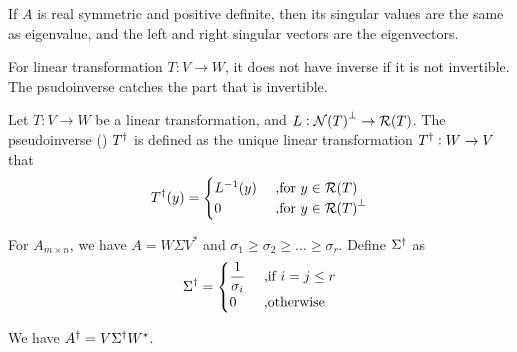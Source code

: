 \begin{theorem}
    If $A$ is real symmetric and positive definite, then its singular values are the same as eigenvalue, and the left and right singular vectors are the eigenvectors.    
\end{theorem}


For linear transformation $T: V \rightarrow W$, it does not have inverse if it is not invertible. The psudoinverse catches the part that is invertible.

\begin{definition}
    Let $T: V \rightarrow W$ be a linear transformation, and $L: \nullspace{T}^\perp \rightarrow \rangespace{T}$. The pseudoinverse () ${T}^\dagger$ is defined as the unique linear transformation ${T}^\dagger: W \rightarrow V$ that
    \begin{equation}
        \pseudoinverse{T}(y) = \begin{aligned}
            \begin{cases}
                \inverse{L}(y) & \text{ ,for } y \in \rangespace{T} \\
                0 & \text{ ,for } y \in \rangespace{T}^\perp
            \end{cases}
        \end{aligned}
    \end{equation}
    
    
    For $A_{m \times n}$, we have $A = W \Sigma V^*$ and $\sigma_1 \geq \sigma_2 \geq ... \geq \sigma_r$. Define ${\Sigma}^\dagger$ as 
    \begin{equation}
        {\Sigma}^\dagger = \begin{aligned}
            \begin{cases}
                \displaystyle \frac{1}{\sigma_i} & \text{ ,if } i = j \leq r \\
                0 & \text{ ,otherwise}
            \end{cases}
        \end{aligned}
    \end{equation}
    
    We have ${A}^\dagger = V {\Sigma}^\dagger W^*$.
\end{definition}
